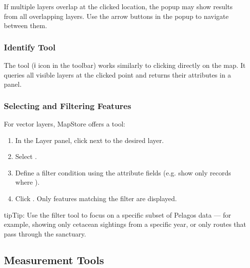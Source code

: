 \documentclass[letterpaper,10pt,english]{sphinxmanual}
\begin{document}
\sphinxAtStartPar
If multiple layers overlap at the clicked location, the pop\sphinxhyphen{}up may show results from
all overlapping layers. Use the arrow buttons in the pop\sphinxhyphen{}up to navigate between them.


\subsubsection{Identify Tool}
\label{\detokenize{en/04_exploring_maps:identify-tool}}
\sphinxAtStartPar
The  tool (ℹ️ icon in the toolbar) works similarly to clicking directly
on the map. It queries all visible layers at the clicked point and returns their
attributes in a panel.


\subsubsection{Selecting and Filtering Features}
\label{\detokenize{en/04_exploring_maps:selecting-and-filtering-features}}
\sphinxAtStartPar
For vector layers, MapStore offers a  tool:
\begin{enumerate}
%
\item {} 
\sphinxAtStartPar
In the Layer panel, click  next to the desired layer.

\item {} 
\sphinxAtStartPar
Select .

\item {} 
\sphinxAtStartPar
Define a filter condition using the attribute fields
(e.g. show only records where ).

\item {} 
\sphinxAtStartPar
Click . Only features matching the filter are displayed.

\end{enumerate}

\begin{sphinxadmonition}{tip}{Tip:}
\sphinxAtStartPar
Use the filter tool to focus on a specific subset of Pelagos data — for example,
showing only cetacean sightings from a specific year, or only routes that pass
through the sanctuary.
\end{sphinxadmonition}


\subsection{Measurement Tools}
\label{\detokenize{en/04_exploring_maps:measurement-tools}}
\end{document}
